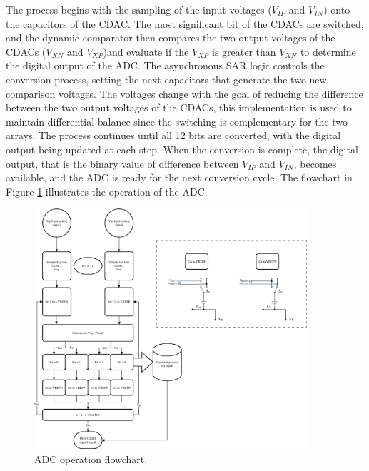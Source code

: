 The process begins with the sampling of the input voltages ($V_{IP}$ and $V_{IN}$) onto the capacitors of the CDAC. The most significant bit of the CDACs are switched, and the dynamic comparator then compares the two output voltages of the CDACs ($V_{XN}$ and $V_{XP}$)and evaluate if the $V_{XP}$ is greater than $V_{XN}$ to determine the digital output of the ADC. 
The asynchronous SAR logic controls the conversion process, setting the next capacitors that generate the two new comparison voltages. The voltages change with the goal of reducing the difference between the two output voltages of the CDACs, this implementation is used to maintain differential balance since the switching is complementary for the two arrays.
The process continues until all 12 bits are converted, with the digital output being updated at each step. When the conversion is complete, the digital output, that is the binary value of difference between $V_{IP}$ and $V_{IN}$, becomes available, and the ADC is ready for the next conversion cycle. The flowchart in Figure \ref{fig:ADC-flowchart} illustrates the operation of the ADC.
\begin{figure}[H]
    \centering
    \includegraphics[width=0.9\textwidth]{Images/operation_ADC.png}
    \caption{ADC operation flowchart.}
    \label{fig:ADC-flowchart}
\end{figure}

